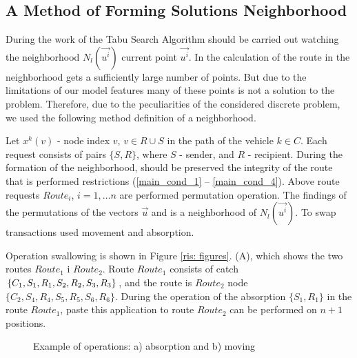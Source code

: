 \documentclass[]{TAACpaper}
\begin{document}
\subsection{A Method of Forming Solutions Neighborhood}

During the work of the Tabu Search Algorithm should be carried out watching the neighborhood $N_{l}(\vec {u^i})$ current point $ \vec{u^i}$. In the calculation of the route in the neighborhood gets a sufficiently large number of points. But due to the limitations of our model features many of these points is not a solution to the problem. Therefore, due to the peculiarities of the considered discrete problem, we used the following method definition of a neighborhood.

Let $x^{k}(v)$ - node index $v$, $ v \in R \cup S $ in the path of the vehicle $ k \in C $. Each request consists of pairs $\{S, R \}$, where $S$ - sender, and $R$ - recipient. During the formation of the neighborhood, should be preserved the integrity of the route that is performed restrictions (\ref {main_cond_1} -- \ref {main_cond_4}). Above route requests $ Route_i $, $ i = 1, \dots n $ are performed permutation operation. The findings of the permutations of the vectors $ \vec {u} $ and is a neighborhood of $ N_{l} (\vec{u^i}) $. To swap transactions used movement and absorption.
	
Operation swallowing is shown in Figure \ref {ris: figures}. (A), which shows the two routes $Route_1 $ i $ Route_2 $. Route $ Route_1 $ consists of catch $ \{C_1, S_1, R_1, S_2, \\ R_2, S_3, R_3 \}$, and the route is $ Route_2 $ node $ \{C_2, S_4, R_4, S_5, R_5, S_6, R_6 \} $. During the operation of the absorption $ \{S_1, R_1 \} $ in the route $ Route_1 $, paste this application to route $ Route_2 $ can be performed on $ n + 1 $ positions.


\begin{figure}[h]
	\caption{Example of operations: a) absorption and b) moving}
	\label{ris:figures}
\end{figure}
\end{document}
